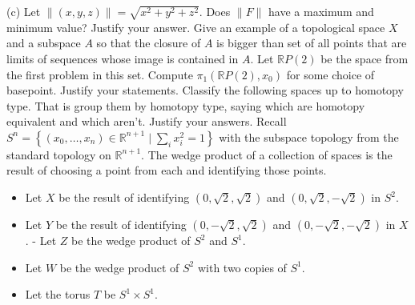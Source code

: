 \documentclass[10pt]{article}
\begin{document}
(c) Let $\|(x, y, z)\|=\sqrt{x^{2}+y^{2}+z^{2}}$. Does $\|F\|$ have a maximum and minimum value? Justify your answer.
\newpage
Give an example of a topological space $X$ and a subspace $A$ so that the closure of $A$ is bigger than set of all points that are limits of sequences whose image is contained in $A$.
\newpage
Let $\mathbb{R} P(2)$ be the space from the first problem in this set. Compute $\pi_{1}\left(\mathbb{R} P(2), x_{0}\right)$ for some choice of basepoint. Justify your statements.
\newpage
Classify the following spaces up to homotopy type. That is group them by homotopy type, saying which are homotopy equivalent and which aren't. Justify your answers.
\newpage
Recall $S^{n}=\left\{\left(x_{0}, \ldots, x_{n}\right) \in \mathbb{R}^{n+1} \mid \sum_{i} x_{i}^{2}=1\right\}$ with the subspace topology from the standard topology on $\mathbb{R}^{n+1}$. The wedge product of a collection of spaces is the result of choosing a point from each and identifying those points.
\begin{itemize}
  \item Let $X$ be the result of identifying $(0, \sqrt{2}, \sqrt{2})$ and $(0, \sqrt{2},-\sqrt{2})$ in $S^{2}$.

  \item Let $Y$ be the result of identifying $(0,-\sqrt{2}, \sqrt{2})$ and $(0,-\sqrt{2},-\sqrt{2})$ in $X$. - Let $Z$ be the wedge product of $S^{2}$ and $S^{1}$.

  \item Let $W$ be the wedge product of $S^{2}$ with two copies of $S^{1}$.

  \item Let the torus $T$ be $S^{1} \times S^{1}$.

\end{itemize}
\end{document}
